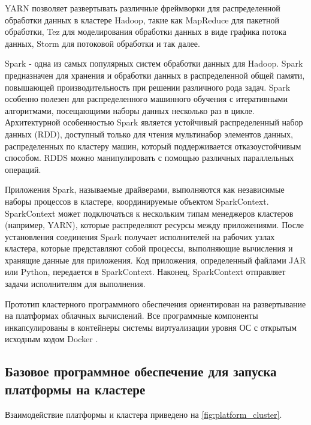 YARN позволяет развертывать различные фреймворки для распределенной обработки данных в кластере Hadoop, такие как 
MapReduce для пакетной обработки, Tez для моделирования обработки данных в виде графика потока данных, Storm 
для потоковой обработки и так далее. 

Spark \cite{zaharia2010spark} - одна из самых популярных систем обработки данных для Hadoop. Spark предназначен 
для хранения и обработки данных в распределенной общей памяти, повышающей производительность при решении различного 
рода задач. Spark особенно полезен для распределенного машинного обучения с итеративными алгоритмами, посещающими 
наборы данных несколько раз в цикле. Архитектурной особенностью Spark является устойчивый распределенный набор 
данных (RDD), доступный только для чтения мультинабор элементов данных, распределенных по кластеру машин, 
который поддерживается отказоустойчивым способом. RDDS можно манипулировать с помощью различных параллельных операций.

Приложения Spark, называемые драйверами, выполняются как независимые наборы процессов в кластере, координируемые 
объектом SparkContext. SparkContext может подключаться к нескольким типам менеджеров кластеров (например, YARN), 
которые распределяют ресурсы между приложениями. После установления соединения Spark получает исполнителей на 
рабочих узлах кластера, которые представляют собой процессы, выполняющие вычисления и хранящие данные для 
приложения. Код приложения, определенный файлами JAR или Python, передается в SparkContext. Наконец, 
SparkContext отправляет задачи исполнителям для выполнения.

Прототип кластерного программного обеспечения ориентирован на развертывание на платформах облачных вычислений. 
Все программные компоненты инкапсулированы в контейнеры системы виртуализации уровня ОС с открытым 
исходным кодом Docker \cite{anderson2015docker}.

\subsection{Базовое программное обеспечение для запуска платформы на кластере}

Взаимодействие платформы и кластера приведено на \cref{fig:platform_cluster}.

